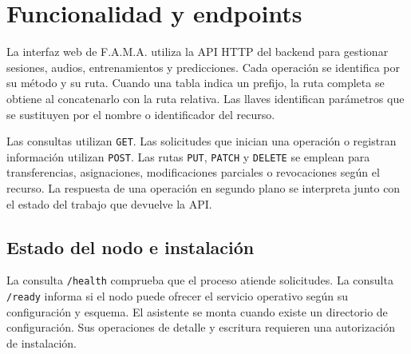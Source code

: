 \chapter{Funcionalidad y endpoints}
\label{ap:funcionalidad-endpoints}

La interfaz web de F.A.M.A. utiliza la API HTTP del backend para gestionar
sesiones, audios, entrenamientos y predicciones. Cada operación se
identifica por su método y su ruta. Cuando una tabla indica un prefijo, la
ruta completa se obtiene al concatenarlo con la ruta relativa. Las llaves
identifican parámetros que se sustituyen por el nombre o identificador del
recurso.

Las consultas utilizan \texttt{GET}. Las solicitudes que inician una
operación o registran información utilizan \texttt{POST}. Las rutas
\texttt{PUT}, \texttt{PATCH} y \texttt{DELETE} se emplean para transferencias,
asignaciones, modificaciones parciales o revocaciones según el recurso. La
respuesta de una operación en segundo plano se interpreta junto con el
estado del trabajo que devuelve la API.

\section{Estado del nodo e instalación}

La consulta \texttt{/health} comprueba que el proceso atiende solicitudes.
La consulta \texttt{/ready} informa si el nodo puede ofrecer el servicio
operativo según su configuración y esquema. El asistente se monta cuando
existe un directorio de configuración. Sus operaciones de detalle y
escritura requieren una autorización de instalación.

